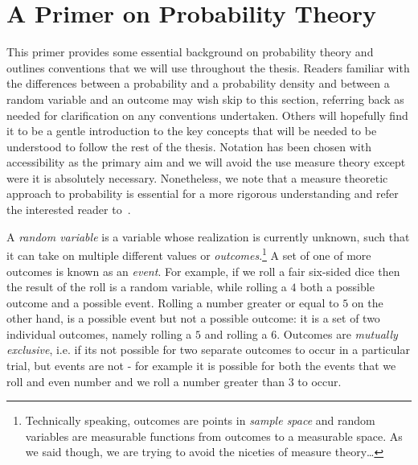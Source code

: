 
\chapter*{A Primer on Probability Theory}

This primer provides some essential background on probability theory and outlines conventions
that we will use throughout the thesis.  Readers familiar with the differences between a probability
and a probability density and between a random variable and an outcome may wish skip to this
section, referring back as needed for clarification on any conventions undertaken.  Others
will hopefully find it to be a gentle introduction to the key concepts that will be needed to
be understood to follow the rest of the thesis.  Notation has been chosen with accessibility 
as the primary aim and we will avoid
the use measure theory except were it is absolutely necessary.  Nonetheless, we note that a measure theoretic
approach to probability is essential for a more rigorous understanding and refer
the interested reader to~\cite{durrett2010probability}.

A \emph{random variable} is a variable
whose realization is currently unknown, such that it can take on multiple different
values or \emph{outcomes}.\footnote{Technically speaking, outcomes are points in \emph{sample
		space} and random variables are measurable functions from outcomes to a measurable
	space.  As we said though, we are trying to avoid the niceties of measure theory\dots}
A set of one of more outcomes is known as an \emph{event}.
For example, if we roll a fair six-sided dice then the result of the roll is a random variable, 
while rolling a $4$ both a possible outcome and a possible event.  Rolling a number greater
or equal to $5$ on the other hand, is a possible event but not a possible outcome: it is a set
of two individual outcomes, namely rolling a $5$ and rolling a $6$.  Outcomes are
\emph{mutually exclusive}, i.e. if its not possible for two separate outcomes to occur in a
particular trial, but events are not - for example it is possible for both the events that we
roll and even number and we roll a number greater than $3$ to occur.

